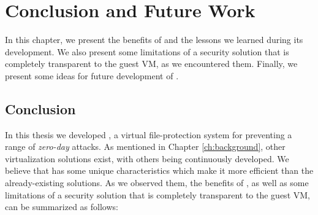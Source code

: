 
\chapter{Conclusion and Future Work}\label{ch:chapter5}

\par In this chapter, we present the benefits of  and the lessons we learned during its development. We also present some limitations of a security solution that is completely transparent to the guest \ac{VM}, as we encountered them. Finally, we present some ideas for future development of .

\section{Conclusion}

\par In this thesis we developed , a virtual file-protection system for preventing a range of \emph{zero-day} attacks. As mentioned in Chapter \ref{ch:background}, other virtualization solutions exist, with others being continuously developed. We believe that  has some unique characteristics which make it more efficient than the already-existing solutions. As we observed them, the benefits of , as well as some limitations of a security solution that is completely transparent to the guest \ac{VM}, can be summarized as follows:


